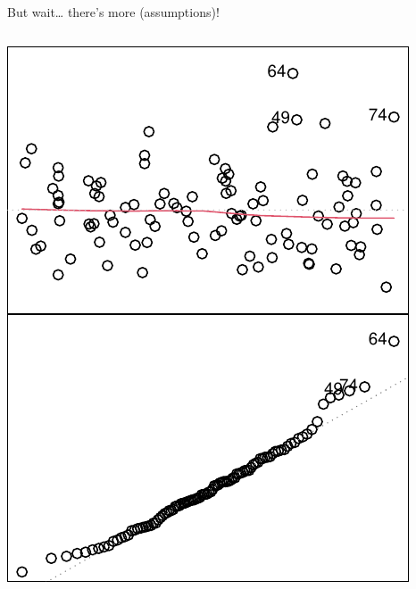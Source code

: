 \documentclass[
  ignorenonframetext,
  aspectratio=169]{beamer}
\begin{document}
\begin{frame}[fragile]{But wait\ldots{} there's more (assumptions)!}
\begin{columns}[T]
\begin{column}{0.48\textwidth}
\includegraphics{03-Lecture_files/figure-beamer/unnamed-chunk-50-1.pdf}
\end{column}
\end{columns}
\end{frame}
\end{document}
